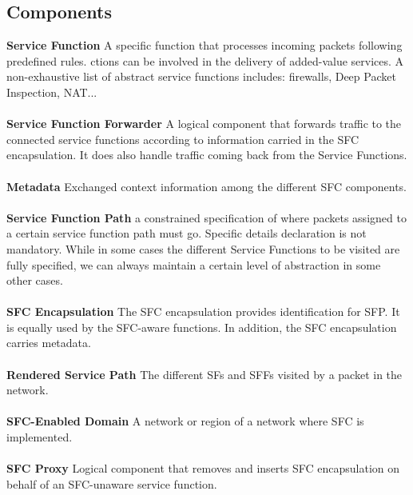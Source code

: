 \documentclass[a4paper]{article}
\begin{document}
\subsection{Components}
\textbf{Service Function} A specific function that processes incoming packets following predefined rules. ctions can be involved in the delivery of added-value services. A non-exhaustive list of abstract service functions includes: firewalls, Deep Packet Inspection, NAT...\\
\\
\textbf{Service Function Forwarder} A logical component that forwards traffic to the connected
service functions according to information carried in the SFC
encapsulation. It does also handle traffic coming back from the
Service Functions.\\ 
\\
\textbf{Metadata} Exchanged context information among the different SFC components.\\
\\
\textbf{Service Function Path} a
constrained specification of where packets assigned to a certain
service function path must go. Specific details declaration is not mandatory. While in some cases the different Service Functions to be visited are fully specified, we can always maintain a certain level of abstraction in some other cases.\\
\\
\textbf{SFC Encapsulation} The SFC encapsulation  provides identification for SFP. It is equally  used by the SFC-aware functions. In addition, the SFC encapsulation carries metadata.\\
\\
\textbf{Rendered Service Path}  The different SFs and SFFs visited by a packet in the network.\\
\\
\textbf{SFC-Enabled Domain} A network or region of a network where SFC is implemented.\\
\\
\textbf{SFC Proxy} Logical component that removes and inserts SFC encapsulation on behalf of an     SFC-unaware service function. 
\end{document}
